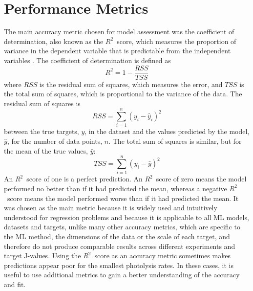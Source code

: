 \documentclass[journal abbreviation, manuscript]{copernicus}
\newcommand{\RR}{\ensuremath{R^2}}
\begin{document}
\section{Performance Metrics}\label{metrics}

The main accuracy metric chosen for model assessment was the coefficient of determination, also known as the \RR\ score, which measures the proportion of variance in the dependent variable that is predictable from the independent variables \citep{draper_applied_1998}. 
The coefficient of determination is defined as 
\begin{equation}
R^2 = 1 - \frac{RSS}{TSS}
\end{equation}
where $RSS$ is the residual sum of squares, which measures the error, and $TSS$ is the total sum of squares, which is proportional to the variance of the data.
The residual sum of squares is
\begin{equation}
  RSS = \sum_{i=1}^{n}(y_i - \hat{y}_i)^2
\end{equation}
between the true targets, $y$, in the dataset and the values predicted by the model, $\hat{y}$, for the number of data points, $n$. 
The total sum of squares is similar, but for the mean of the true values, $\bar{y}$:
\begin{equation}
  TSS = \sum_{i=1}^{n}(y_i - \bar{y})^2
\end{equation}
An \RR\ score of one is a perfect prediction. An \RR\ score of zero means the model performed no better than if it had predicted the mean, whereas a negative \RR\ score means the model performed worse than if it had predicted the mean. 
It was chosen as the main metric because it is widely used and intuitively understood for regression problems and because it is applicable to all ML models, datasets and targets, unlike many other accuracy metrics, which are specific to the ML method, the dimensions of the data or the scale of each target, and therefore do not produce comparable results across different experiments and target J-values. 
Using the \RR\ score as an accuracy metric sometimes makes predictions appear poor for the smallest photolysis rates. In these cases, it is useful to use additional metrics to gain a better understanding of the accuracy and fit.


\end{document}
